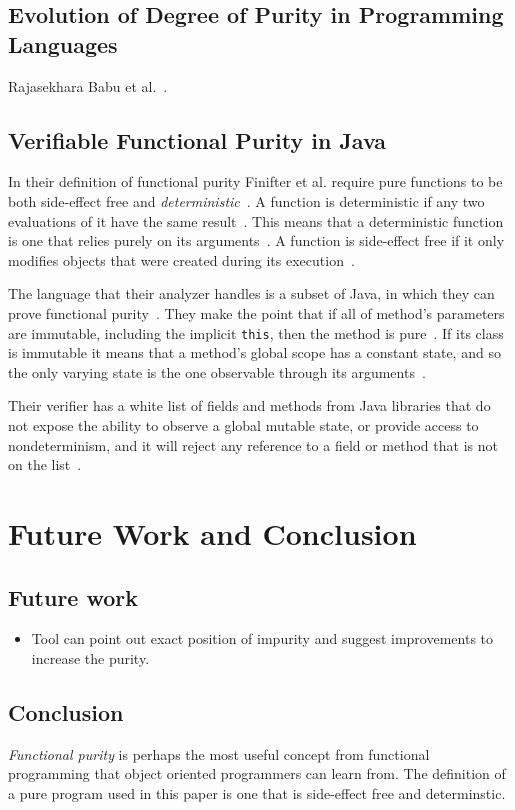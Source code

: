 \documentclass[a4paper,12pt]{article}
\begin{document}
\subsection{Evolution of Degree of Purity in Programming Languages} \label{sub:Evolution of Degree of Purity in Programming Languages}
Rajasekhara Babu et al.~\cite{rajasekharababu2012evolution}.

\subsection{Verifiable Functional Purity in Java} \label{sub:Verifiable-Functional-Purity-in-Java}
In their definition of functional purity Finifter et al. require pure functions to be both side-effect free and \textit{deterministic}~\cite{purity-in-java}. A function is deterministic if any two evaluations of it have the same result~\cite{purity-in-java}. This means that a deterministic function is one that relies purely on its arguments~\cite{purity-in-java}. A function is side-effect free if it only modifies objects that were created during its execution~\cite{purity-in-java}.

The language that their analyzer handles is a subset of Java, in which they can prove functional purity~\cite{purity-in-java}. They make the point that if all of method's parameters are immutable, including the implicit \texttt{this}, then the method is pure~\cite{purity-in-java}. %
If its class is immutable it means that a method's global scope has a constant state, and so the only varying state is the one observable through its arguments~\cite{purity-in-java}.

Their verifier has a white list of fields and methods from Java libraries that do not expose the ability to observe a global mutable state, or provide access to nondeterminism, and it will reject any reference to a field or method that is not on the list~\cite{purity-in-java}.

\section{Future Work and Conclusion} \label{sec:Conclusion and future Work}
\subsection{Future work} \label{sub:Future work}

\begin{itemize}
  \item Tool can point out exact position of impurity and suggest improvements to increase the purity.
\end{itemize}

\subsection{Conclusion} \label{sub:Conclusion}
\textit{Functional purity} is perhaps the most useful concept from functional programming that object oriented programmers can learn from. The definition of a pure program used in this paper is one that is side-effect free and determinstic.



\end{document}
